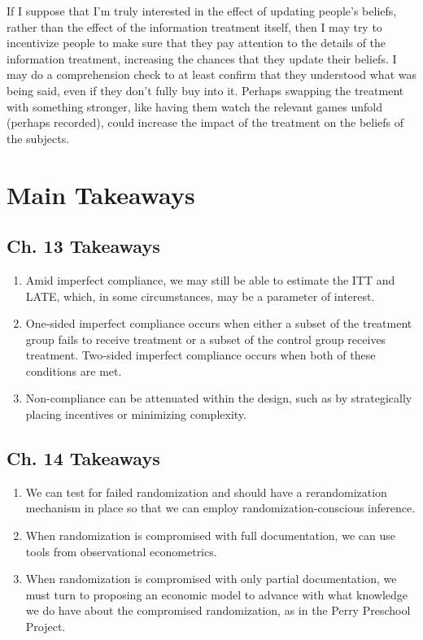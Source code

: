 \documentclass[10pt]{article}
\begin{document}
If I suppose that I'm truly interested in the effect of 
updating people's beliefs, rather than the effect 
of the information treatment itself, then I may try to 
incentivize people to make sure that they pay attention 
to the details of the information treatment, increasing the 
chances that they update their beliefs. I may do a 
comprehension check to at least confirm that they 
understood what was being said, even if they don't fully 
buy into it. Perhaps swapping the treatment with something 
stronger, like having them watch the relevant games 
unfold (perhaps recorded), could increase the 
impact of the treatment on the beliefs of the subjects.


\section{Main Takeaways}

\subsection{Ch. 13 Takeaways}

\begin{enumerate}
    \item Amid imperfect compliance, we may still be able to estimate 
        the ITT and LATE, which, in some circumstances, may 
        be a parameter of interest.
    \item One-sided imperfect compliance occurs 
        when either a subset of the treatment group fails to 
        receive treatment or a subset of the control group
        receives treatment. Two-sided imperfect compliance
        occurs when both of these conditions are met.
    \item Non-compliance can be attenuated within the 
        design, such as by strategically placing incentives or 
        minimizing complexity.
\end{enumerate}

\subsection{Ch. 14 Takeaways}

\begin{enumerate}
    \item We can test for failed randomization 
        and should have a rerandomization mechanism in place
        so that we can employ randomization-conscious inference.
    \item When randomization is compromised with full 
        documentation, we can use tools from 
        observational econometrics.
    \item When randomization is compromised with only 
        partial documentation, we must turn to proposing 
        an economic model to advance with what knowledge we 
        do have about the compromised randomization, as 
        in the Perry Preschool Project.
\end{enumerate}
\end{document}
